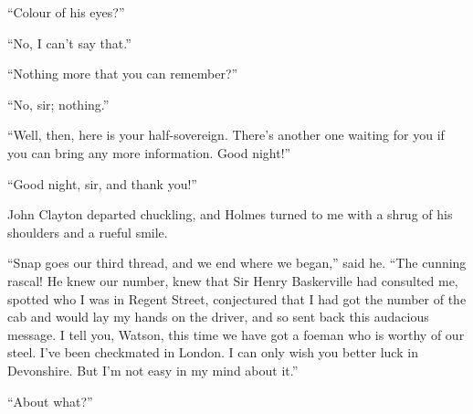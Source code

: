 \documentclass[paper=5.5in:8.5in,BCOR=7mm,twoside,DIV=calc,12pt,usegeometry,openany,chapterprefix,endperiod,headings=big]{scrbook} %
\begin{document}
\enquote{Colour of his eyes?}

\enquote{No, I can't say that.}

\enquote{Nothing more that you can remember?}

\enquote{No, sir; nothing.}

\enquote{Well, then, here is your half-sovereign. There's another one waiting for you if you can bring any more information. Good night!}

\enquote{Good night, sir, and thank you!}

John Clayton departed chuckling, and Holmes turned to me with a shrug of his shoulders and a rueful smile.

\enquote{Snap goes our third thread, and we end where we began,} said he. \enquote{The cunning rascal! He knew our number, knew that Sir Henry Baskerville had consulted me, spotted who I was in Regent Street, conjectured that I had got the number of the cab and would lay my hands on the driver, and so sent back this audacious message. I tell you, Watson, this time we have got a foeman who is worthy of our steel. I've been checkmated in London. I can only wish you better luck in Devonshire. But I'm not easy in my mind about it.}

\enquote{About what?}
\end{document}
